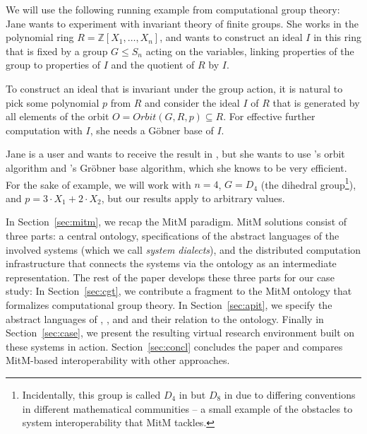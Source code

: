 We will use the following running example from computational group theory: Jane
wants to experiment with invariant theory of finite groups. She works in the
polynomial ring $R=\mathbb{Z}[X_1,\ldots,X_n]$, and wants to construct an ideal $I$
in this ring that is fixed by a group $G \leq S_n$ acting on the variables,
linking properties of the group to properties of $I$ and the quotient of
$R$ by $I$.

To construct an ideal that is invariant
under the group action, it is natural to pick some polynomial $p$ from $R$
and consider the ideal $I$ of $R$ that is generated by all elements of the orbit
$O=Orbit(G,R,p)\subseteq R$.
For effective further computation with $I$, she needs a G\"obner base of $I$.

Jane is a \Sage user and wants to receive the result in \Sage, but she wants to
use \GAP's orbit algorithm and \Singular's Gr\"obner base algorithm, which she
knows to be very efficient. For the sake of example, we will work with $n=4$,
$G=D_4$ (the dihedral group\footnote{Incidentally, this group is called $D_4$ in
\Sage but $D_8$ in \GAP due to differing conventions in different mathematical
communities -- a small example of the obstacles to system interoperability that
MitM tackles.}), and $p=3\cdot X_1+2\cdot X_2$, but our results apply to
arbitrary values.

In Section~\ref{sec:mitm}, we recap the MitM paradigm.
MitM solutions consist of three parts: a central ontology, specifications of the abstract languages of the involved systems (which we call \emph{system dialects}), and the distributed computation infrastructure that connects the systems via the ontology as an intermediate representation.
The rest of the paper develops these three parts for our case study:
In Section~\ref{sec:cgt}, we contribute a fragment to the MitM ontology that formalizes computational group theory.
In Section~\ref{sec:apit}, we specify the abstract languages of \GAP, \Sage, and \Singular and their relation to the ontology.
Finally in Section~\ref{sec:case}, we present the resulting virtual research environment built on these systems in action.
Section~\ref{sec:concl} concludes the paper and compares MitM-based interoperability with other approaches.


